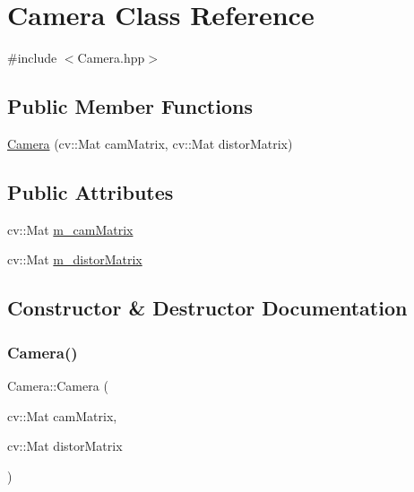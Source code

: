 \hypertarget{classCamera}{}\section{Camera Class Reference}
\label{classCamera}


{\ttfamily \#include $<$Camera.\+hpp$>$}

\subsection*{Public Member Functions}
\begin{DoxyCompactItemize}
\item 
\hyperlink{classCamera_a78409cfe6144605909a1df119e51735c}{Camera} (cv\+::\+Mat cam\+Matrix, cv\+::\+Mat distor\+Matrix)
\end{DoxyCompactItemize}
\subsection*{Public Attributes}
\begin{DoxyCompactItemize}
\item 
cv\+::\+Mat \hyperlink{classCamera_a1a20cdb75b56f843febf9bcfceeed9ff}{m\+\_\+cam\+Matrix}
\item 
cv\+::\+Mat \hyperlink{classCamera_a1bdef6fb4df5f4b40d3f6e50b027348a}{m\+\_\+distor\+Matrix}
\end{DoxyCompactItemize}


\subsection{Constructor \& Destructor Documentation}
\mbox{\label{classCamera_a78409cfe6144605909a1df119e51735c}} 
\subsubsection{\texorpdfstring{Camera()}{Camera()}}
{\footnotesize\ttfamily Camera\+::\+Camera (\begin{DoxyParamCaption}\item[{cv\+::\+Mat}]{cam\+Matrix,  }\item[{cv\+::\+Mat}]{distor\+Matrix }\end{DoxyParamCaption})\hspace{0.3cm}{\ttfamily [inline]}}



